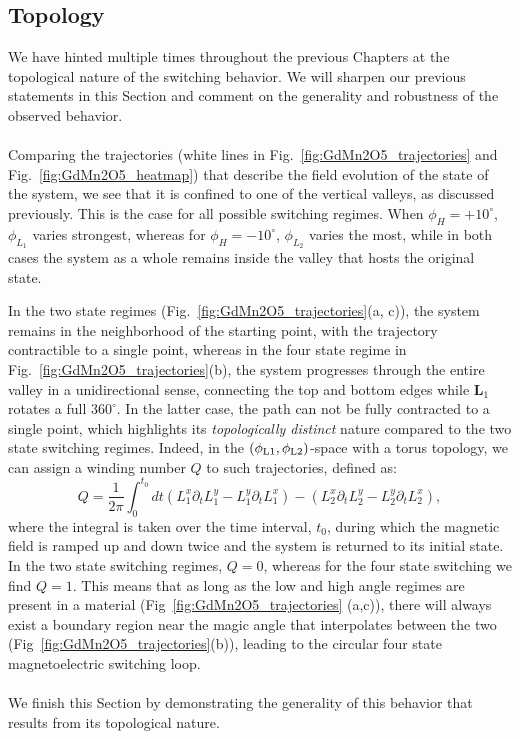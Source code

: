 \subsection{Topology \label{sec:GdMn2O5_topology}}
We have hinted multiple times throughout the previous Chapters at the topological nature of the switching behavior.
We will sharpen our previous statements in this Section and comment on the generality and robustness of the observed behavior.
\\\\
Comparing the trajectories (white lines in Fig.~\ref{fig:GdMn2O5_trajectories} and Fig.~\ref{fig:GdMn2O5_heatmap}) that describe the field evolution of the state of the system, we see that it is confined to one of the vertical valleys, as discussed previously.
This is the case for all possible switching regimes. When $\phi_H = +10^\circ$, $\phi_{L_1}$ varies strongest, whereas for $\phi_H = -10^\circ$, $\phi_{L_2}$ varies the most, while in both cases the system as a whole remains inside the valley that hosts the original state.

In the two state regimes (Fig.~\ref{fig:GdMn2O5_trajectories}(a, c)), the system remains in the neighborhood of the starting point, with the trajectory contractible to a single point, whereas in the four state regime in Fig.~\ref{fig:GdMn2O5_trajectories}(b), the system progresses through the entire valley in a unidirectional sense, connecting the top and bottom edges while $\bm{L}_1$ rotates a full $360^\circ$.
In the latter case, the path can not be fully contracted to a single point, which highlights its {\em  topologically distinct} nature compared to the two state switching regimes.
Indeed, in the $(\phi_{\rm L1},\phi_{\rm L2})$-space with a torus topology, we can assign a winding number $Q$ to such trajectories, defined as:
\begin{equation}
Q=\frac{1}{2\pi}\int_0^{t_0} dt (L_1^x\partial_t L_1^y - L_1^y \partial_t L_1^x) - (L_2^x\partial_t L_2^y - L_2^y \partial_t L_2^x),
\end{equation}
where the integral is taken over the time interval, $t_0$, during which the magnetic field is ramped up and down twice and the system is returned to its initial state.
In the two state switching regimes, $Q  = 0$, whereas for the four state switching we find $Q = 1$.
This means that as long as the low and high angle regimes are present in a material (Fig~\ref{fig:GdMn2O5_trajectories} (a,c)), there will always exist a boundary region near the magic angle that interpolates between the two (Fig~\ref{fig:GdMn2O5_trajectories}(b)), leading to the circular four state magnetoelectric switching loop.
\\\\
We finish this Section by demonstrating the generality of this behavior that results from its topological nature.

